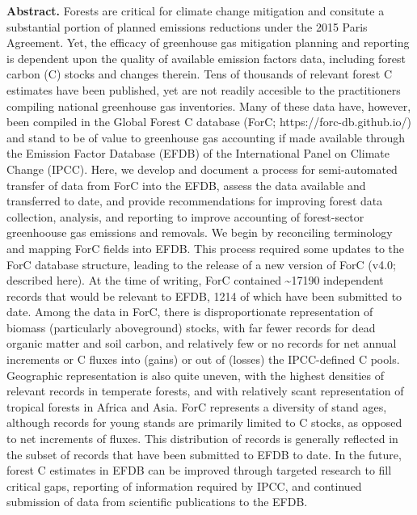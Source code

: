 \documentclass[, manuscript]{copernicus}
\begin{document}
\textbf{Abstract.} Forests are critical for climate change mitigation
and consitute a substantial portion of planned emissions reductions
under the 2015 Paris Agreement. Yet, the efficacy of greenhouse gas
mitigation planning and reporting is dependent upon the quality of
available emission factors data, including forest carbon (C) stocks and
changes therein. Tens of thousands of relevant forest C estimates have
been published, yet are not readily accesible to the practitioners
compiling national greenhouse gas inventories. Many of these data have,
however, been compiled in the Global Forest C database (ForC;
https://forc-db.github.io/) and stand to be of value to greenhouse gas
accounting if made available through the Emission Factor Database (EFDB)
of the International Panel on Climate Change (IPCC). Here, we develop
and document a process for semi-automated transfer of data from ForC
into the EFDB, assess the data available and transferred to date, and
provide recommendations for improving forest data collection, analysis,
and reporting to improve accounting of forest-sector greenhoouse gas
emissions and removals. We begin by reconciling terminology and mapping
ForC fields into EFDB. This process required some updates to the ForC
database structure, leading to the release of a new version of ForC
(v4.0; described here). At the time of writing, ForC contained
\textasciitilde17190 independent records that would be relevant to EFDB,
1214 of which have been submitted to date. Among the data in ForC, there
is disproportionate representation of biomass (particularly aboveground)
stocks, with far fewer records for dead organic matter and soil carbon,
and relatively few or no records for net annual increments or C fluxes
into (gains) or out of (losses) the IPCC-defined C pools. Geographic
representation is also quite uneven, with the highest densities of
relevant records in temperate forests, and with relatively scant
representation of tropical forests in Africa and Asia. ForC represents a
diversity of stand ages, although records for young stands are primarily
limited to C stocks, as opposed to net increments of fluxes. This
distribution of records is generally reflected in the subset of records
that have been submitted to EFDB to date. In the future, forest C
estimates in EFDB can be improved through targeted research to fill
critical gaps, reporting of information required by IPCC, and continued
submission of data from scientific publications to the EFDB.

\introduction[Introduction]
\end{document}
